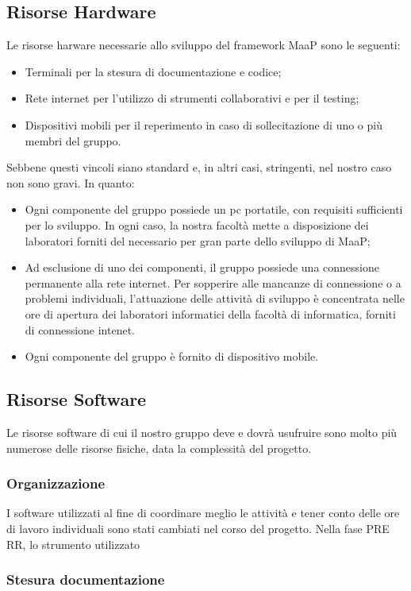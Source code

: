 \subsection{Risorse Hardware}
Le risorse harware necessarie allo sviluppo del framework MaaP sono le seguenti:
\begin{itemize}
\item Terminali per la stesura di documentazione e codice;
\item Rete internet per l'utilizzo di strumenti collaborativi e per il testing;
\item Dispositivi mobili per il reperimento in caso di sollecitazione di uno o più membri del gruppo.
\end{itemize}
Sebbene questi vincoli siano standard e, in altri casi, stringenti, nel nostro caso non sono gravi. In quanto:
\begin{itemize}
\item Ogni componente del gruppo possiede un pc portatile, con requisiti sufficienti per lo sviluppo. In ogni caso, la nostra facoltà mette a disposizione dei laboratori forniti del necessario per gran parte dello sviluppo di MaaP;
\item Ad esclusione di uno dei componenti, il gruppo possiede una connessione permanente alla rete internet. Per sopperire alle mancanze di connessione o a problemi individuali, l'attuazione delle attività di sviluppo è concentrata nelle ore di apertura dei laboratori informatici della facoltà di informatica, forniti di connessione intenet.
\item Ogni componente del gruppo è fornito di dispositivo mobile. 
\end{itemize}

\subsection{Risorse Software}
Le risorse software di cui il nostro gruppo deve e dovrà usufruire sono molto più numerose delle risorse fisiche, data la complessità del progetto. 
\subsubsection{Organizzazione}
I software utilizzati al fine di coordinare meglio le attività e tener conto delle ore di lavoro individuali sono stati cambiati nel corso del progetto. Nella fase PRE RR, lo strumento utilizzato
\subsubsection{Stesura documentazione}
